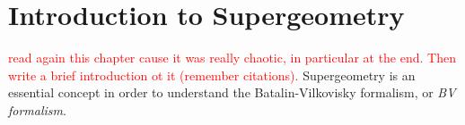 \chapter{Introduction to Supergeometry}
\label{chap:intro_supergeom}

\textcolor{red}{read again this chapter cause it was really chaotic, in particular at the end. Then write a brief introduction ot it (remember citations).}
Supergeometry is an essential concept in order to understand the Batalin-Vilkovisky formalism, or \emph{BV formalism}.




